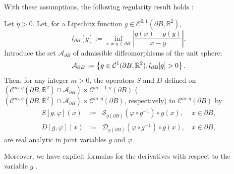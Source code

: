 With these assumptions, the following regularity result holds \cite{crisoforis2004}:
\begin{theorem} \label{theorem:analycity}Let $\eta>0$. Let, for
a Lipschitz function $g \in \mathcal{C}^{0,1}\left(\partial
B,\mathbb{R}^{2}\right)$,
\[
l_{\partial B}[g]:=\inf_{x\neq y\in\partial
B}\left|\frac{g(x)-g(y)}{x-y}\right|.
\]
Introduce the set $\mathcal{A}_{\partial B}$ of admissible
diffeomorphisms of the unit sphere:
\[
\mathcal{A}_{\partial B}:=\left\{ g\in \mathcal{C}^{1}(\partial
B,\mathbb{R}^{2}),l_{\text{\ensuremath{\partial}B}}[g]>0\right\} .
\]
 Then, for any integer $m>0$, the operators $S$ and $D$ defined on
  $\left(\mathcal{C}^{m,\eta}(\partial B,\mathbb{R}^{2})\cap\mathcal{A}_{\partial B}\right)
 \times \mathcal{C}^{m-1,\eta}(\partial B)$
($\left(\mathcal{C}^{m,\eta}(\partial
B,\mathbb{R}^{2})\cap\mathcal{A}_{\partial B}\right)\times
\mathcal{C}^{m,\eta}(\partial B)$, respectively) to
$\mathcal{C}^{m,\eta}(\partial B)$ by
\[
\begin{alignedat}{2}S[g,\varphi](x) & := & \mathcal{S}_{g(\partial B)}(\varphi \circ g^{-1})\circ g(x), & \, x\in\partial B,\\
D[g,\varphi](x) & := & \mathcal{D}_{g(\partial B)}(\varphi \circ
g^{-1})\circ g(x), & \, x\in\partial B,
\end{alignedat}
\]
 are real analytic in joint variables $g$ and $\varphi$.
\end{theorem} Moreover, we have explicit formulas for the derivatives
with respect to the variable $g$ \cite{crisoforis2004}.

